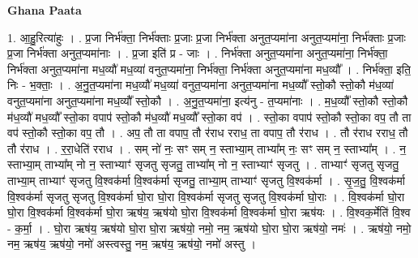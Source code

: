 \documentclass[17pt]{extarticle}
\begin{document}
\textbf{Ghana Paata } \newline

1. आ॒हु॒रित्या॑हुः । . प्र॒जा निर्भ॑क्ता॒ निर्भ॑क्ताः प्र॒जाः प्र॒जा निर्भ॑क्ता अनुत॒प्यमा॑ना अनुत॒प्यमा॑ना॒ निर्भ॑क्ताः प्र॒जाः प्र॒जा निर्भ॑क्ता अनुत॒प्यमा॑नाः । . प्र॒जा इति॑ प्र - जाः । . निर्भ॑क्ता अनुत॒प्यमा॑ना अनुत॒प्यमा॑ना॒ निर्भ॑क्ता॒ निर्भ॑क्ता अनुत॒प्यमा॑ना मध॒व्यौ॑ मध॒व्या॑ वनुत॒प्यमा॑ना॒ निर्भ॑क्ता॒ निर्भ॑क्ता अनुत॒प्यमा॑ना मध॒व्यौ᳚ । . निर्भ॑क्ता॒ इति॒ निः - भ॒क्ताः॒ । . अ॒नु॒त॒प्यमा॑ना मध॒व्यौ॑ मध॒व्या॑ वनुत॒प्यमा॑ना अनुत॒प्यमा॑ना मध॒व्यौ᳚ स्तो॒कौ स्तो॒कौ म॑ध॒व्या॑ वनुत॒प्यमा॑ना अनुत॒प्यमा॑ना मध॒व्यौ᳚ स्तो॒कौ । . अ॒नु॒त॒प्यमा॑ना॒ इत्य॑नु - त॒प्यमा॑नाः । . म॒ध॒व्यौ᳚ स्तो॒कौ स्तो॒कौ म॑ध॒व्यौ॑ मध॒व्यौ᳚ स्तो॒का वपाप॑ स्तो॒कौ म॑ध॒व्यौ॑ मध॒व्यौ᳚ स्तो॒का वप॑ । . स्तो॒का वपाप॑ स्तो॒कौ स्तो॒का वप॒ तौ ता वप॑ स्तो॒कौ स्तो॒का वप॒ तौ । . अप॒ तौ ता वपाप॒ तौ र॑राध रराध॒ ता वपाप॒ तौ र॑राध । . तौ र॑राध रराध॒ तौ तौ र॑राध । . र॒रा॒धेति॑ रराध । . सम् नो॑ नः॒ सꣳ सम् न॒ स्ताभ्या॒म् ताभ्या᳚म् नः॒ सꣳ सम् न॒ स्ताभ्या᳚म् । . न॒ स्ताभ्या॒म् ताभ्या᳚म् नो न॒ स्ताभ्याꣳ॑ सृजतु सृजतु॒ ताभ्या᳚म् नो न॒ स्ताभ्याꣳ॑ सृजतु । . ताभ्याꣳ॑ सृजतु सृजतु॒ ताभ्या॒म् ताभ्याꣳ॑ सृजतु वि॒श्वक॑र्मा वि॒श्वक॑र्मा सृजतु॒ ताभ्या॒म् ताभ्याꣳ॑ सृजतु वि॒श्वक॑र्मा । . सृ॒ज॒तु॒ वि॒श्वक॑र्मा वि॒श्वक॑र्मा सृजतु सृजतु वि॒श्वक॑र्मा घो॒रा घो॒रा वि॒श्वक॑र्मा सृजतु सृजतु वि॒श्वक॑र्मा घो॒राः । . वि॒श्वक॑र्मा घो॒रा घो॒रा वि॒श्वक॑र्मा वि॒श्वक॑र्मा घो॒रा ऋष॑य॒ ऋष॑यो घो॒रा वि॒श्वक॑र्मा 
वि॒श्वक॑र्मा घो॒रा ऋष॑यः । . वि॒श्वक॒र्मेति॑ वि॒श्व - क॒र्मा॒ । . घो॒रा ऋष॑य॒ ऋष॑यो घो॒रा घो॒रा ऋष॑यो॒ नमो॒ नम॒ ऋष॑यो घो॒रा घो॒रा ऋष॑यो॒ नमः॑ । . ऋष॑यो॒ नमो॒ नम॒ ऋष॑य॒ ऋष॑यो॒ नमो॑ अस्त्वस्तु॒ नम॒ ऋष॑य॒ ऋष॑यो॒ नमो॑ अस्तु । \newline
\end{document}
